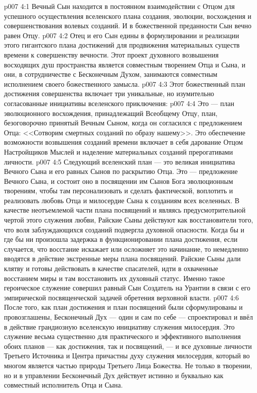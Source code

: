 \vs p007 4:1 Вечный Сын находится в постоянном взаимодействии с Отцом для успешного осуществления  вселенского плана создания, эволюции, восхождения и совершенствования волевых созданий. И в божественной преданности Сын вечно равен Отцу.
\vs p007 4:2 Отец и его Сын едины в формулировании и реализации этого гигантского плана достижений для продвижения материальных существ времени к совершенству вечности. Этот проект духовного возвышения восходящих душ пространства является совместным творением Отца и Сына, и они, в сотрудничестве с Бесконечным Духом, занимаются совместным исполнением своего божественного замысла.
\vs p007 4:3 \pc Этот божественный план достижения совершенства включает три уникальные, но изумительно согласованные инициативы вселенского приключения:
\vs p007 4:4  Это --- план эволюционного восхождения, принадлежащий Всеобщему Отцу, план, безоговорочно принятый Вечным Сыном, когда он согласился с предложением Отца: <<Сотворим смертных созданий по образу нашему>>. Это обеспечение возможности возвышения созданий времени включает в себя дарование Отцом Настройщиков Мыслей и наделение материальных созданий прерогативами личности.
\vs p007 4:5  Следующий вселенский план --- это великая инициатива Вечного Сына и его равных Сынов по раскрытию Отца. Это --- предложение Вечного Сына, и состоит оно в посвящении им Сынов Бога эволюционным творениям, чтобы там персонализовать и сделать фактической, воплотить и реализовать любовь Отца и милосердие Сына к созданиям всех вселенных. В качестве неотъемлемой части плана посвящений и являясь предусмотрительной чертой этого служения любви, Райские Сыны действуют как восстановители того, что воля заблуждающихся созданий подвергла духовной опасности. Когда бы и где бы ни произошла задержка в функционировании плана достижения, если случается, что восстание искажает или осложняет это начинание, то немедленно вводятся в действие экстренные меры плана посвящений. Райские Сыны дали клятву и готовы действовать в качестве спасателей, идти в охваченные восстанием миры и там восстановить их духовный статус. Именно такое героическое служение совершил равный Сын Создатель на Урантии в связи с его эмпирической посвященческой задачей обретения верховной власти.
\vs p007 4:6  После того, как план достижения и план посвящений были сформулированы и провозглашены, Бесконечный Дух --- один и сам по себе --- спроектировал и ввёл в действие грандиозную вселенскую инициативу служения милосердия. Это служение весьма существенно для практического и эффективного выполнения обоих планов --- как достижения, так и посвящений, --- и все духовные личности Третьего Источника и Центра причастны духу служения милосердия, который во многом является частью природы Третьего Лица Божества. Не только в творении, но и в управлении Бесконечный Дух действует истинно и буквально как совместный исполнитель Отца и Сына.
